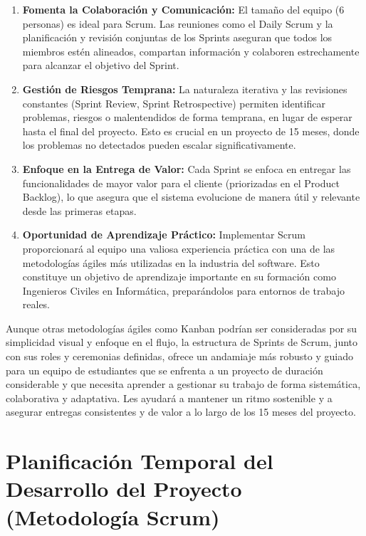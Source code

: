 \begin{enumerate}
    \item \textbf{Fomenta la Colaboración y Comunicación:}
    El tamaño del equipo (6 personas) es ideal para Scrum. Las reuniones como el Daily Scrum y la planificación y revisión conjuntas de los Sprints aseguran que todos los miembros estén alineados, compartan información y colaboren estrechamente para alcanzar el objetivo del Sprint.

    \item \textbf{Gestión de Riesgos Temprana:}
    La naturaleza iterativa y las revisiones constantes (Sprint Review, Sprint Retrospective) permiten identificar problemas, riesgos o malentendidos de forma temprana, en lugar de esperar hasta el final del proyecto. Esto es crucial en un proyecto de 15 meses, donde los problemas no detectados pueden escalar significativamente.

    \item \textbf{Enfoque en la Entrega de Valor:}
    Cada Sprint se enfoca en entregar las funcionalidades de mayor valor para el cliente (priorizadas en el Product Backlog), lo que asegura que el sistema evolucione de manera útil y relevante desde las primeras etapas.

    \item \textbf{Oportunidad de Aprendizaje Práctico:}
    Implementar Scrum proporcionará al equipo una valiosa experiencia práctica con una de las metodologías ágiles más utilizadas en la industria del software. Esto constituye un objetivo de aprendizaje importante en su formación como Ingenieros Civiles en Informática, preparándolos para entornos de trabajo reales.
\end{enumerate}

Aunque otras metodologías ágiles como Kanban podrían ser consideradas por su simplicidad visual y enfoque en el flujo, la estructura de Sprints de Scrum, junto con sus roles y ceremonias definidas, ofrece un andamiaje más robusto y guiado para un equipo de estudiantes que se enfrenta a un proyecto de duración considerable y que necesita aprender a gestionar su trabajo de forma sistemática, colaborativa y adaptativa. Les ayudará a mantener un ritmo sostenible y a asegurar entregas consistentes y de valor a lo largo de los 15 meses del proyecto.


\section[Planificación Temporal]{Planificación Temporal del Desarrollo del Proyecto (Metodología Scrum)}

